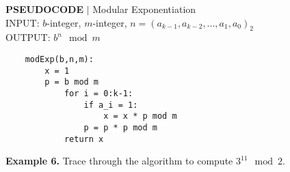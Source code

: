 \documentclass [12pt]{article}
\begin{document}
\begin{framed}
\noindent\textbf{PSEUDOCODE} $|$ Modular Exponentiation\\
INPUT: $b$-integer, $m$-integer, $n=(a_{k-1},a_{k-2},...,a_1,a_0)_2$\\
OUTPUT: $b^n\mod m$\\
\begin{lstlisting}
    modExp(b,n,m):
        x = 1
        p = b mod m
            for i = 0:k-1:
                if a_i = 1:
                    x = x * p mod m
                p = p * p mod m
            return x
\end{lstlisting}
\end{framed}
\noindent\textbf{Example 6.} Trace through the algorithm to compute $3^11\mod2$.\\
\end{document}
